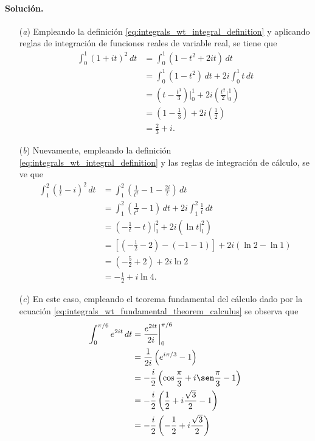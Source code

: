 \documentclass[a4paper]{report}
\begin{document}
\paragraph{Solución.} 
\begin{enumerate}
 \item[(\textit{a})] Empleando la definición \ref{eq:integrals_wt_integral_definition} y aplicando reglas de integración de funciones reales de variable real, se tiene que 
 \begin{align*}
  \int_0^1(1+it)^2\,dt&=\int_0^1(1-t^2+2it)\,dt\\
   &=\int_0^1(1-t^2)\,dt+2i\int_0^1 t\,dt\\
   &=\left(t-\frac{t^3}{3}\right)\bigg|_0^1+2i\left(\frac{t^2}{2}\bigg|_0^1\right)\\
   &=\left(1-\frac{1}{3}\right)+2i\left(\frac{1}{2}\right)\\
   &=\frac{2}{3}+i.
 \end{align*}
 \item[(\textit{b})] Nuevamente, empleando la definición \ref{eq:integrals_wt_integral_definition} y las reglas de integración de cálculo, se ve que  
 \begin{align*}
  \int_1^2\left(\frac{1}{t}-i\right)^2\,dt&=\int_1^2\left(\frac{1}{t^2}-1-\frac{2i}{t}\right)\,dt\\
   &=\int_1^2\left(\frac{1}{t^2}-1\right)\,dt+2i\int_1^2\frac{1}{t}\,dt\\
   &=\left(-\frac{1}{t}-t\right)\bigg|_1^2+2i\left(\ln t\bigg|_1^2\right)\\
   &=\left[\left(-\frac{1}{2}-2\right)-\left(-1-1\right)\right]
    +2i\left(\ln2-\ln1\right)\\
   &=\left(-\frac{5}{2}+2\right)+2i\ln2\\
   &=-\frac{1}{2}+i\ln4.
 \end{align*}
 \item[(\textit{c})] En este caso, empleando el teorema fundamental del cálculo dado por la ecuación \ref{eq:integrals_wt_fundamental_theorem_calculus} se observa que 
 \begin{align*}
  \int_0^{\pi/6}e^{2it}\,dt&=\frac{e^{2it}}{2i}\bigg|_0^{\pi/6}\\
   &=\frac{1}{2i}\left(e^{i\pi/3}-1\right)\\
   &=-\frac{i}{2}\left(\cos\frac{\pi}{3}+i\sen\frac{\pi}{3}-1\right)\\
   &=-\frac{i}{2}\left(\frac{1}{2}+i\frac{\sqrt{3}}{2}-1\right)\\
   &=-\frac{i}{2}\left(-\frac{1}{2}+i\frac{\sqrt{3}}{2}\right)\\

\end{align*}
\end{enumerate}
\end{document}
